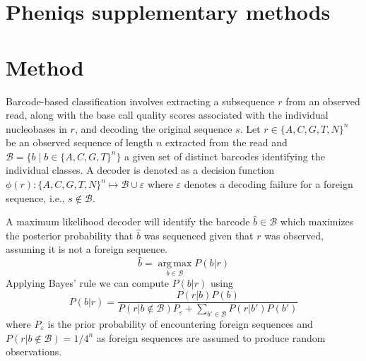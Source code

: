 \documentclass[10pt,twocolumn]{article}
\begin{document}
\section{Pheniqs supplementary methods}

\section{Method}

Barcode-based classification involves extracting a subsequence $r$ from an observed read, along with the base call quality scores associated with the individual nucleobases in $r$, and decoding the original sequence $s$. Let $r \in \{A,C,G,T,N\}^n$ be an observed sequence of length $n$ extracted from the read and $\mathcal{B} = \{b \mid b \in \{A,C,G,T\}^n\}$ a given set of distinct barcodes
identifying the individual classes. A decoder is denoted as a decision function $\phi(r):\{A,C,G,T,N\}^n \mapsto \mathcal{B} \cup \varepsilon$ where $\varepsilon$ denotes a decoding failure for a foreign sequence, i.e., $s \notin \mathcal{B}$.

A maximum likelihood decoder will identify the barcode $\hat{b} \in \mathcal{B}$ which maximizes the posterior probability that $\hat{b}$ was sequenced given that $r$ was observed, assuming it is not a foreign sequence.
%
\begin{equation}
\hat{b} = \operatorname*{arg\,max}_{b \in \mathcal{B}} P(b|r)
\end{equation}
%
Applying Bayes' rule we can compute $P(b|r)$ using
%
\begin{equation}
P(b|r) = \frac{P(r|b)P(b)}{P(r|b \notin \mathcal{B})P_{\varepsilon} + \sum_{b' \in \mathcal{B}} P(r|b')P(b')}
\end{equation}
%
where $P_\varepsilon$ is the prior probability of encountering foreign sequences and $P(r|b \notin \mathcal{B}) = 1/4^n$ as foreign sequences are assumed to produce random observations.
\end{document}

